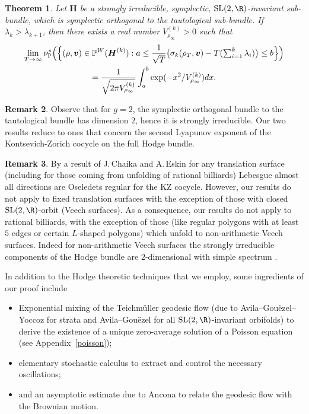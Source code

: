\documentclass[JEP,XML,SOM,Unicode,published]{cedram}
\theoremstyle{plain}
\newtheorem{thm}{Theorem}[section]
\theoremstyle{definition}
\newtheorem{rem}[thm]{Remark}
\numberwithin{equation}{subsection}
\newcommand\bP{\mathbb{P}}
\newcommand{\SL}{\mathrm{SL}}
\newcommand{\bfH}{\boldsymbol{H}}
\newcommand{\bfv}{\boldsymbol{v}}
\newcommand{\Tm}{Teichmüller\xspace}
\begin{document}
\begin{thm}\label{rclt}
Let $\bfH$ be a strongly irreducible, symplectic, $\SL(2,\R)$-invariant sub-bundle, which is symplectic orthogonal to the tautological sub-bundle. If $\lambda_k > \lambda_{k+1}$, then there exists a real number $V^{(k)}_{\rho_\infty} > 0$ such that
\begin{multline*}
\lim_{T\to\infty}\nu^*_{\bP} \Bigl(\Bigl\{(\rho,\bfv) \in \bP^W(\bfH^{(k)}) : a \leq \frac{1}{\sqrt{T}} \bigl(\sigma_k(\rho_{T}, \bfv)- T(\textstyle\sum_{i=1}^k\lambda_{i}) \bigr) \leq b \Bigr\} \Bigr)
\\ = \frac{1}{\sqrt{2\pi V^{(k)}_{\rho_\infty}}}\int_a^b\exp(-x^2/V^{(k)}_{\rho_\infty})dx.
\end{multline*}
\end{thm}

\begin{rem}
Observe that for $g=2$, the symplectic orthogonal bundle to the tautological bundle has dimension $2$, hence it is strongly irreducible. Our two results reduce to ones that concern the second Lyapunov exponent of the Kontsevich-Zorich cocycle on the full Hodge bundle.
\end{rem}

\begin{rem}
By a result of J.\,Chaika and A.\,Eskin \cite{CE13} for any translation surface (including for those coming from unfolding of rational billiards) Lebesgue almost all directions are Oseledets regular for the KZ cocycle. However, our results do not apply to fixed translation surfaces with the exception of those with closed $\SL(2, \R)$-orbit (Veech surfaces). As a consequence, our results do not apply to rational billiards, with the exception of those (like regular polygons with at least $5$ edges or certain $L$-shaped polygons) which unfold to non-arithmetic Veech surfaces. Indeed for non-arithmetic Veech surfaces the strongly irreducible components of the Hodge bundle are $2$-dimensional with simple spectrum \cite{Mol06}.
\end{rem}

In addition to the Hodge theoretic techniques that we employ, some ingredients of our proof include

\begin{itemize}
\item Exponential mixing of the \Tm geodesic flow (due to Avila--Gouëzel--Yoccoz \cite{AGY06} for strata and Avila--Gouëzel \cite{AG13} for all $\SL(2,\R)$-invariant orbifolds) to derive the existence of a unique zero-average solution of a Poisson equation (see
Appendix~\ref{poisson});
\item elementary stochastic calculus to extract and control the necessary oscillations;
\item and an asymptotic estimate due to Ancona \cite{Anc90} to relate the geodesic flow with the Brownian motion.
\end{itemize}
\end{document}
